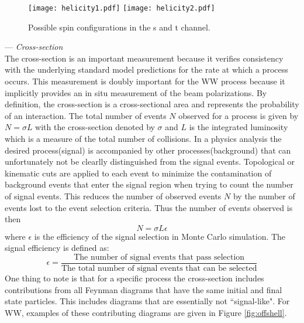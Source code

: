 \begin{figure}
\centering
\texttt{[image: helicity1.pdf]}
\texttt{[image: helicity2.pdf]}
\caption{Possible spin configurations in the s and t channel. \cite{helicity}}
\label{fig:spindiag}
\end{figure}


--- \textit{Cross-section}\\
The cross-section is an important measurement because it verifies consistency with the underlying standard model predictions for the rate at which a process occurs. This measurement is doubly important for the WW process because it implicitly provides an in situ measurement of the beam polarizations. By definition, the cross-section is a cross-sectional area and represents the probability of an interaction. The total number of events $N$ observed for a process is given by $ N= \sigma L$ with the cross-section denoted by $\sigma$ and $L$ is the integrated luminosity which is a measure of the total number of collisions. In a physics analysis the desired process(signal) is accompanied by other processes(background) that can unfortunately not be clearlly distinguished from the signal events. Topological or kinematic cuts are applied to each event to minimize the contamination of background events that enter the signal region when trying to count the number of signal events. This reduces the number of observed events $N$ by the number of events lost to the event selection criteria. Thus the number of events observed is then 
\begin{equation}
N = \sigma  L  \epsilon
\end{equation}
where $\epsilon$ is the efficiency of the signal selection in Monte Carlo simulation. The signal efficiency is defined as:
 \begin{equation}
\epsilon = \frac{\text{The number of signal events that pass selection}}{ \text{The total number of signal events that can be selected}}
\end{equation} 
One thing to note is that for a specific process the cross-section includes contributions from all Feynman diagrams that have the same initial and final state particles. This includes diagrams that are essentially not ``signal-like". For WW, examples of these contributing diagrams are given in Figure \ref{fig:offshell}.

